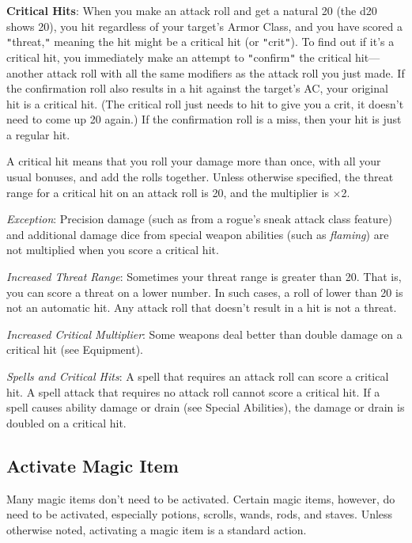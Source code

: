\textbf{Critical Hits}: When you make an attack roll and get a natural 20 (the d20 shows 20), you hit regardless of your target's Armor Class, and you have scored a \texttt{{}"{}}threat,\texttt{{}"{}} meaning the hit might be a critical hit (or \texttt{{}"{}}crit\texttt{{}"{}}). To find out if it's a critical hit, you immediately make an attempt to \texttt{{}"{}}confirm\texttt{{}"{}} the critical hit---another attack roll with all the same modifiers as the attack roll you just made. If the confirmation roll also results in a hit against the target's AC, your original hit is a critical hit. (The critical roll just needs to hit to give you a crit, it doesn't need to come up 20 again.) If the confirmation roll is a miss, then your hit is just a regular hit.
				
A critical hit means that you roll your damage more than once, with all your usual bonuses, and add the rolls together. Unless otherwise specified, the threat range for a critical hit on an attack roll is 20, and the multiplier is \mbox{$\times$}2.
				
\textit{Exception}: Precision damage (such as from a rogue's sneak attack class feature) and additional damage dice from special weapon abilities (such as \textit{flaming}) are not multiplied when you score a critical hit.
				
\textit{Increased Threat Range}: Sometimes your threat range is greater than 20. That is, you can score a threat on a lower number. In such cases, a roll of lower than 20 is not an automatic hit. Any attack roll that doesn't result in a hit is not a threat.
				
\textit{Increased Critical Multiplier}: Some weapons deal better than double damage on a critical hit (see Equipment).
				
\textit{Spells and Critical Hits}: A spell that requires an attack roll can score a critical hit. A spell attack that requires no attack roll cannot score a critical hit. If a spell causes ability damage or drain (see Special Abilities), the damage or drain is doubled on a critical hit.
				
\subsection{Activate Magic Item}

				
Many magic items don't need to be activated. Certain magic items, however, do need to be activated, especially potions, scrolls, wands, rods, and staves. Unless otherwise noted, activating a magic item is a standard action.
				
